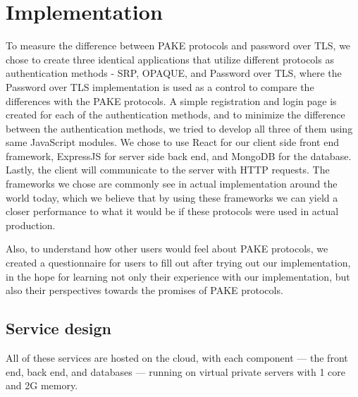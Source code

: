 \section{Implementation}

To measure the difference between PAKE protocols and password over TLS, we chose to create three identical applications that utilize different protocols as authentication methods - SRP, OPAQUE, and Password over TLS, where the Password over TLS implementation is used as a control to compare the differences with the PAKE protocols.
A simple registration and login page is created for each of the authentication methods, and to minimize the difference between the authentication methods, we tried to develop all three of them using same JavaScript modules. 
We chose to use React for our client side front end framework, ExpressJS for server side back end, and MongoDB for the database.
Lastly, the client will communicate to the server with HTTP requests.
The frameworks we chose are commonly see in actual implementation around the world today, which we believe that by using these frameworks we can yield a closer performance to what it would be if these protocols were used in actual production.


Also, to understand how other users would feel about PAKE protocols, we created a questionnaire for users to fill out after trying out our implementation, in the hope for learning not only their experience with our implementation, but also their perspectives towards the promises of PAKE protocols.





\subsection{Service design}
All of these services are hosted on the cloud, with each component — the front end, back end, and databases — running on virtual private servers with 1 core and 2G memory.

